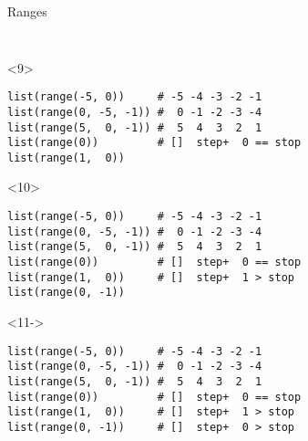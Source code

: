 \begin{frame}[fragile]{Ranges}
\begin{center}
\begin{columns}[onlytextwidth]
\begin{column}{\textwidth}
\begin{onlyenv}
\begin{lstlisting}[style=python,morekeywords={for, in, range, list}]
 \end{lstlisting}
      \end{onlyenv}

      \begin{onlyenv}<9>
        \begin{lstlisting}[style=python,morekeywords={for, in, range, list}]
list(range(-5, 0))     # -5 -4 -3 -2 -1
list(range(0, -5, -1)) #  0 -1 -2 -3 -4
list(range(5,  0, -1)) #  5  4  3  2  1
list(range(0))         # []  step+  0 == stop
list(range(1,  0))
 \end{lstlisting}
      \end{onlyenv}

      \begin{onlyenv}<10>
        \begin{lstlisting}[style=python,morekeywords={for, in, range, list}]
list(range(-5, 0))     # -5 -4 -3 -2 -1
list(range(0, -5, -1)) #  0 -1 -2 -3 -4
list(range(5,  0, -1)) #  5  4  3  2  1
list(range(0))         # []  step+  0 == stop
list(range(1,  0))     # []  step+  1 > stop
list(range(0, -1)) \end{lstlisting}
      \end{onlyenv}

      \begin{onlyenv}<11->
        \begin{lstlisting}[style=python,morekeywords={for, in, range, list}]
list(range(-5, 0))     # -5 -4 -3 -2 -1
list(range(0, -5, -1)) #  0 -1 -2 -3 -4
list(range(5,  0, -1)) #  5  4  3  2  1
list(range(0))         # []  step+  0 == stop
list(range(1,  0))     # []  step+  1 > stop
list(range(0, -1))     # []  step+  0 > stop \end{lstlisting}
      \end{onlyenv}

    \end{column}
  \end{columns}

  \end{center}

\end{frame}


